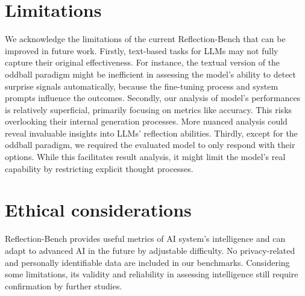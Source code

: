 \section*{Limitations}
We acknowledge the limitations of the current Reflection-Bench that can be improved in future work. Firstly, text-based tasks for LLMs may not fully capture their original effectiveness. For instance, the textual version of the oddball paradigm might be inefficient in assessing the model's ability to detect surprise signals automatically, because the fine-tuning process and system prompts influence the outcomes. Secondly, our analysis of model's performances is relatively superficial, primarily focusing on metrics like accuracy. This risks overlooking their internal generation processes. More nuanced analysis could reveal invaluable insights into LLMs' reflection abilities. Thirdly, except for the oddball paradigm, we required the evaluated model to only respond with their options. While this facilitates result analysis, it might limit the model's real capability by restricting explicit thought processes.

\section*{Ethical considerations}
Reflection-Bench provides useful metrics of AI system's intelligence and can adapt to advanced AI in the future by adjustable difficulty. No privacy-related and personally identifiable data are included in our benchmarks. Considering some limitations, its validity and reliability in assessing intelligence still require confirmation by further studies.

